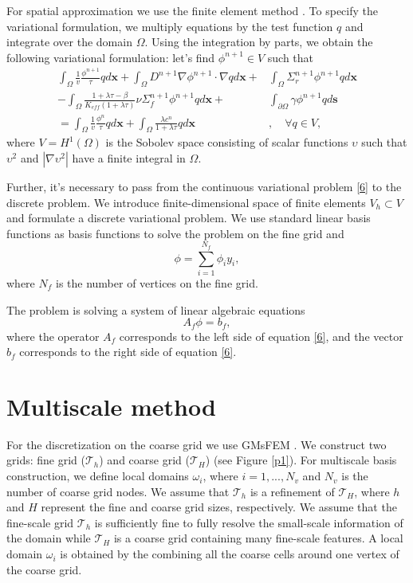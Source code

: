 \documentclass[10pt]{article}
\begin{document}
For spatial approximation we use the finite element method \cite{Brenner2007}.
To specify the variational formulation, we multiply equations by the test function $q$ and integrate over the domain $\Omega$.
Using the integration by parts, we obtain the following variational formulation: let's find $\phi^{n+1} \in V$ such that
\begin{equation} \label{6}
\begin{split}
	\int_\Omega \frac{1}{v} \frac{\phi^{n + 1}}{\tau} q d \bm x +
	\int_\Omega D^{n + 1} \nabla \phi^{n + 1} \cdot \nabla q d \bm x + &
	\int_\Omega \Sigma_r^{n + 1} \phi^{n + 1} q d \bm x \\
	- \int_\Omega \frac{1 + \lambda \tau - \beta}{K_{eff}(1 + \lambda \tau)} \nu \Sigma_f^{n + 1} \phi^{n + 1} q d \bm x + &
	\int_{\partial \Omega} \gamma \phi^{n + 1} q d \bm s \\
	= \int_\Omega \frac{1}{v} \frac{\phi^{n}}{\tau} q d \bm x +
	\int_\Omega \frac{\lambda c^n}{1 + \lambda \tau} q d \bm x &, \quad \forall q \in V,
\end{split}
\end{equation}
where $V=H^1(\Omega)$ is the Sobolev space consisting of scalar functions $\upsilon$ such that $\upsilon^2$ and $|\nabla \upsilon^2|$ have a finite integral in $\Omega$.

Further, it's necessary to pass from the continuous variational problem \eqref{6} to the discrete problem.
We introduce finite-dimensional space of finite elements $V_h \subset V$ and formulate a discrete variational problem.
We use standard linear basis functions as basis functions to solve the problem on the fine grid and
\[
	\phi = \sum_{i = 1}^{N_f} \phi_i y_i,
\]
where $N_f$ is the number of vertices on the fine grid.

The problem is solving a system of linear algebraic equations
\begin{equation} \label{7}
	A_f \phi = b_f,
\end{equation}
where the operator $A_f$ corresponds to the left side of equation \eqref{6}, and the vector $b_f$ corresponds to the right side of equation \eqref{6}.

\section{Multiscale method}
For the discretization on the coarse grid we use GMsFEM \cite{Efendiev2013}.
We construct two grids: fine grid ($\mathcal{T}_h$) and coarse grid ($\mathcal{T}_H$) (see Figure \ref{p1}).
For multiscale basis construction, we define local domains $\omega_i$, where $i = 1,...,N_v$ and $N_v$ is the number of coarse grid nodes.
We assume that $\mathcal{T}_h$ is a refinement of $\mathcal{T}_H$, where $h$ and $H$ represent the fine and coarse grid sizes, respectively.
We assume that the fine-scale grid $\mathcal{T}_h$ is sufficiently fine to fully resolve the small-scale information of the domain  while $\mathcal{T}_H$ is a coarse grid containing many fine-scale features.
A local domain $\omega_i$ is obtained by the combining all the coarse cells around one vertex of the coarse grid.
\end{document}
